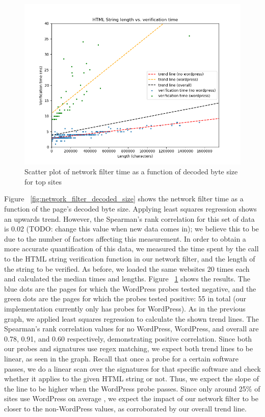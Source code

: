 \begin{figure}[h]
	\includegraphics[scale=0.4]{results/string_length_vs_verification_time}
	\caption{Scatter plot of network filter time as a function of decoded byte size for top sites}
	\label{fig:verification_time_string_length}
\end{figure}

Figure ~\ref{fig:network_filter_decoded_size} shows the network filter time as a function of the page's decoded byte size. Applying least squares regression shows an upwards trend. However, the Spearman's rank correlation for this set of data is 0.02 (TODO: change this value when new data comes in); we believe this to be due to the number of factors affecting this measurement. In order to obtain a more accurate quantification of this data, we measured the time spent by the call to the HTML string verification function in our network filter, and the length of the string to be verified. As before, we loaded the same websites 20 times each and calculated the median times and lengths. Figure ~\ref{fig:verification_time_string_length} shows the results. The blue dots are the pages for which the WordPress probes tested negative, and the green dots are the pages for which the probes tested positive: 55 in total (our implementation currently only has probes for WordPress). As in the previous graph, we applied least squares regression to calculate the shown trend lines. The Spearman's rank correlation values for no WordPress, WordPress, and overall are 0.78, 0.91, and 0.60 respectively, demonstrating positive correlation. Since both our probes and signatures use regex matching, we expect both trend lines to be linear, as seen in the graph. Recall that once a probe for a certain software passes, we do a linear scan over the signatures for that specific software and check whether it applies to the given HTML string or not. Thus, we expect the slope of the line to be higher when the WordPress probe passes. Since only around 25\% of sites use WordPress on average \cite{w3techs}, we expect the impact of our network filter to be closer to the non-WordPress values, as corroborated by our overall trend line.

